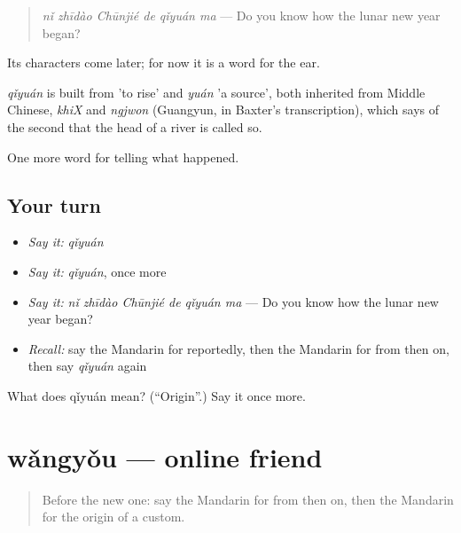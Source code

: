 \begin{quote}
\emph{nǐ zhīdào Chūnjié de qǐyuán ma} — Do you know how the lunar new year began?
\end{quote}

Its characters come later; for now it is a word for the ear.

\begin{cousinweb}
\emph{qǐyuán} is built from  'to rise' and \emph{yuán} 'a source', both inherited from Middle Chinese, \emph{khiX} and \emph{ngjwon} (Guangyun, in Baxter's transcription), which says of the second that the head of a river is called so.
\end{cousinweb}

\begin{grammarlens}[title={What you've built}]
One more word for telling what happened.
\end{grammarlens}

\subsection*{Your turn}
\begin{itemize}
\raggedright
  \item \emph{Say it:} \emph{qǐyuán}
  \item \emph{Say it:} \emph{qǐyuán}, once more
  \item \emph{Say it:} \emph{nǐ zhīdào Chūnjié de qǐyuán ma} — Do you know how the lunar new year began?
  \item \emph{Recall:} say the Mandarin for reportedly, then the Mandarin for from then on, then say \emph{qǐyuán} again
\end{itemize}

\begin{tcolorbox}[breakable,colback=teal!4,colframe=teal!35!black,title={Before you move on}]
What does qǐyuán mean? (\textquotedblleft{}Origin\textquotedblright{}.) Say it once more.
\end{tcolorbox}
\section[wǎngyǒu]{wǎngyǒu — online friend}

\label{lesson:ZH-C345-wangyou}



\begin{quote}
Before the new one: say the Mandarin for from then on, then the Mandarin for the origin of a custom.
\end{quote}

